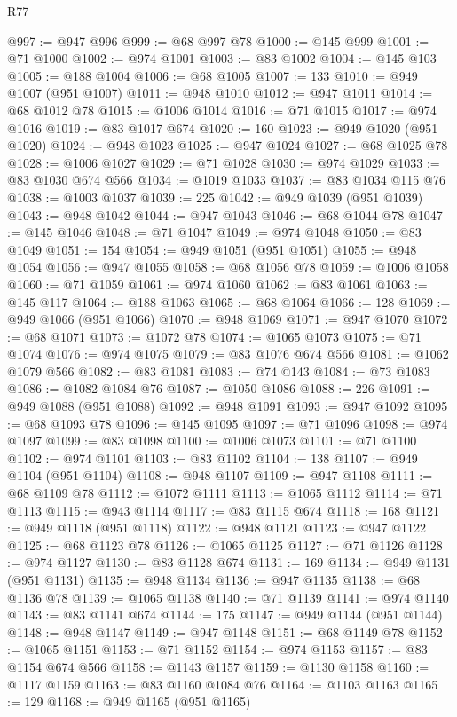 \begin{lexlean}{R77}
\begin{coremodule}
{{@997 := @947 @996
@999 := @68 @997 @78
@1000 := @145 @999
@1001 := @71 @1000
@1002 := @974 @1001
@1003 := @83 @1002
@1004 := @145 @103
@1005 := @188 @1004
@1006 := @68 @1005
@1007 := 133
@1010 := @949 @1007 (@951 @1007)
@1011 := @948 @1010
@1012 := @947 @1011
@1014 := @68 @1012 @78
@1015 := @1006 @1014
@1016 := @71 @1015
@1017 := @974 @1016
@1019 := @83 @1017 @674
@1020 := 160
@1023 := @949 @1020 (@951 @1020)
@1024 := @948 @1023
@1025 := @947 @1024
@1027 := @68 @1025 @78
@1028 := @1006 @1027
@1029 := @71 @1028
@1030 := @974 @1029
@1033 := @83 @1030 @674 @566
@1034 := @1019 @1033
@1037 := @83 @1034 @115 @76
@1038 := @1003 @1037
@1039 := 225
@1042 := @949 @1039 (@951 @1039)
@1043 := @948 @1042
@1044 := @947 @1043
@1046 := @68 @1044 @78
@1047 := @145 @1046
@1048 := @71 @1047
@1049 := @974 @1048
@1050 := @83 @1049
@1051 := 154
@1054 := @949 @1051 (@951 @1051)
@1055 := @948 @1054
@1056 := @947 @1055
@1058 := @68 @1056 @78
@1059 := @1006 @1058
@1060 := @71 @1059
@1061 := @974 @1060
@1062 := @83 @1061
@1063 := @145 @117
@1064 := @188 @1063
@1065 := @68 @1064
@1066 := 128
@1069 := @949 @1066 (@951 @1066)
@1070 := @948 @1069
@1071 := @947 @1070
@1072 := @68 @1071
@1073 := @1072 @78
@1074 := @1065 @1073
@1075 := @71 @1074
@1076 := @974 @1075
@1079 := @83 @1076 @674 @566
@1081 := @1062 @1079 @566
@1082 := @83 @1081
@1083 := @74 @143
@1084 := @73 @1083
@1086 := @1082 @1084 @76
@1087 := @1050 @1086
@1088 := 226
@1091 := @949 @1088 (@951 @1088)
@1092 := @948 @1091
@1093 := @947 @1092
@1095 := @68 @1093 @78
@1096 := @145 @1095
@1097 := @71 @1096
@1098 := @974 @1097
@1099 := @83 @1098
@1100 := @1006 @1073
@1101 := @71 @1100
@1102 := @974 @1101
@1103 := @83 @1102
@1104 := 138
@1107 := @949 @1104 (@951 @1104)
@1108 := @948 @1107
@1109 := @947 @1108
@1111 := @68 @1109 @78
@1112 := @1072 @1111
@1113 := @1065 @1112
@1114 := @71 @1113
@1115 := @943 @1114
@1117 := @83 @1115 @674
@1118 := 168
@1121 := @949 @1118 (@951 @1118)
@1122 := @948 @1121
@1123 := @947 @1122
@1125 := @68 @1123 @78
@1126 := @1065 @1125
@1127 := @71 @1126
@1128 := @974 @1127
@1130 := @83 @1128 @674
@1131 := 169
@1134 := @949 @1131 (@951 @1131)
@1135 := @948 @1134
@1136 := @947 @1135
@1138 := @68 @1136 @78
@1139 := @1065 @1138
@1140 := @71 @1139
@1141 := @974 @1140
@1143 := @83 @1141 @674
@1144 := 175
@1147 := @949 @1144 (@951 @1144)
@1148 := @948 @1147
@1149 := @947 @1148
@1151 := @68 @1149 @78
@1152 := @1065 @1151
@1153 := @71 @1152
@1154 := @974 @1153
@1157 := @83 @1154 @674 @566
@1158 := @1143 @1157
@1159 := @1130 @1158
@1160 := @1117 @1159
@1163 := @83 @1160 @1084 @76
@1164 := @1103 @1163
@1165 := 129
@1168 := @949 @1165 (@951 @1165)
}}
\end{coremodule}
\end{lexlean}
